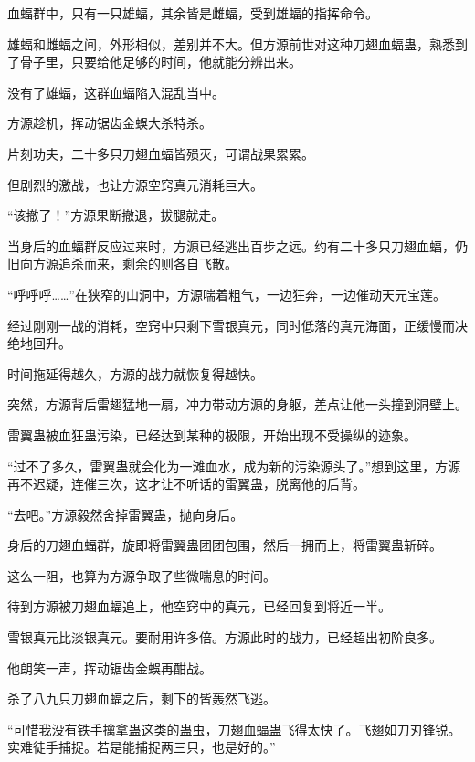 
\begin{this_body}



血蝠群中，只有一只雄蝠，其余皆是雌蝠，受到雄蝠的指挥命令。

雄蝠和雌蝠之间，外形相似，差别并不大。但方源前世对这种刀翅血蝠蛊，熟悉到了骨子里，只要给他足够的时间，他就能分辨出来。

没有了雄蝠，这群血蝠陷入混乱当中。

方源趁机，挥动锯齿金蜈大杀特杀。

片刻功夫，二十多只刀翅血蝠皆殒灭，可谓战果累累。

但剧烈的激战，也让方源空窍真元消耗巨大。

“该撤了！”方源果断撤退，拔腿就走。

当身后的血蝠群反应过来时，方源已经逃出百步之远。约有二十多只刀翅血蝠，仍旧向方源追杀而来，剩余的则各自飞散。

“呼呼呼……”在狭窄的山洞中，方源喘着粗气，一边狂奔，一边催动天元宝莲。

经过刚刚一战的消耗，空窍中只剩下雪银真元，同时低落的真元海面，正缓慢而决绝地回升。

时间拖延得越久，方源的战力就恢复得越快。

突然，方源背后雷翅猛地一扇，冲力带动方源的身躯，差点让他一头撞到洞壁上。

雷翼蛊被血狂蛊污染，已经达到某种的极限，开始出现不受操纵的迹象。

“过不了多久，雷翼蛊就会化为一滩血水，成为新的污染源头了。”想到这里，方源再不迟疑，连催三次，这才让不听话的雷翼蛊，脱离他的后背。

“去吧。”方源毅然舍掉雷翼蛊，抛向身后。

身后的刀翅血蝠群，旋即将雷翼蛊团团包围，然后一拥而上，将雷翼蛊斩碎。

这么一阻，也算为方源争取了些微喘息的时间。

待到方源被刀翅血蝠追上，他空窍中的真元，已经回复到将近一半。

雪银真元比淡银真元。要耐用许多倍。方源此时的战力，已经超出初阶良多。

他朗笑一声，挥动锯齿金蜈再酣战。

杀了八九只刀翅血蝠之后，剩下的皆轰然飞逃。

“可惜我没有铁手擒拿蛊这类的蛊虫，刀翅血蝠蛊飞得太快了。飞翅如刀刃锋锐。实难徒手捕捉。若是能捕捉两三只，也是好的。”


\end{this_body}
